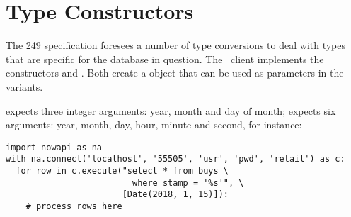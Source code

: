 \section{Type Constructors}
The  249 specification foresees a number
of type conversions to deal with types that are specific
for the database in question.
The \nowdb\ client implements the constructors
 and .
Both create a   object that can be used
as parameters in the  variants.

 expects three integer arguments:
year, month and day of month;
 expects six arguments:
year, month, day, hour, minute and second,
for instance:

\begin{python}
\begin{lstlisting}
import nowapi as na
with na.connect('localhost', '55505', 'usr', 'pwd', 'retail') as c:
  for row in c.execute("select * from buys \
                         where stamp = '%s'", \
                       [Date(2018, 1, 15)]):
    # process rows here
\end{lstlisting}
\end{python}
